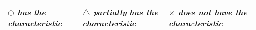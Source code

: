 {\begin{landscape}
\begin{table}[]
\centering
\begin{tabular}{|l|l|l|}
\hline
{\it $\bigcirc$ has the characteristic} & {\it $\bigtriangleup$ partially has the characteristic} & {\it $\times$ does not have the characteristic} \\ \hline
\end{tabular}
\end{table}

  \end{landscape}
  \clearpage
}

\clearpage
